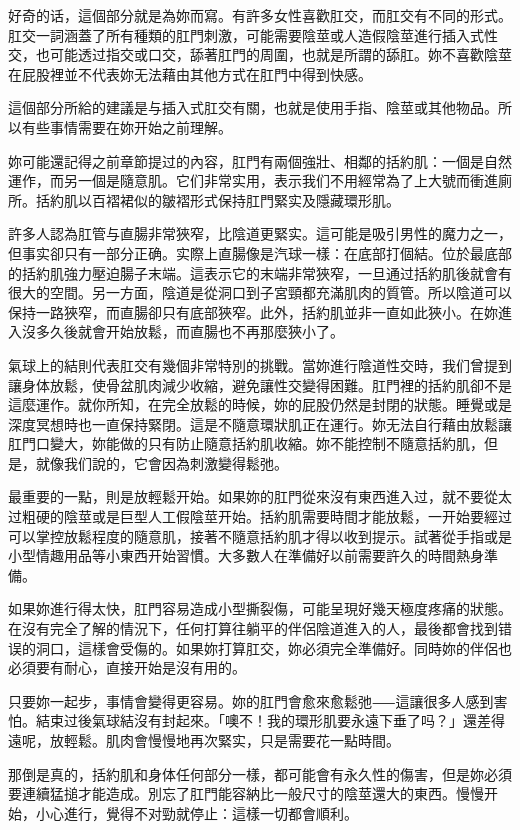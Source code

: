 \documentclass[12pt,UTF8]{ctexbook}
\begin{document}
好奇的话，這個部分就是為妳而寫。有許多女性喜歡肛交，而肛交有不同的形式。肛交一詞涵蓋了所有種類的肛門刺激，可能需要陰莖或人造假陰莖進行插入式性交，也可能透过指交或口交，舔著肛門的周圍，也就是所謂的舔肛。妳不喜歡陰莖在屁股裡並不代表妳无法藉由其他方式在肛門中得到快感。

這個部分所給的建議是与插入式肛交有關，也就是使用手指、陰莖或其他物品。所以有些事情需要在妳开始之前理解。

妳可能還記得之前章節提过的內容，肛門有兩個強壯、相鄰的括約肌：一個是自然運作，而另一個是隨意肌。它们非常实用，表示我们不用經常為了上大號而衝進廁所。括約肌以百褶裙似的皺褶形式保持肛門緊实及隱藏環形肌。

許多人認為肛管与直腸非常狹窄，比陰道更緊实。這可能是吸引男性的魔力之一，但事实卻只有一部分正确。实際上直腸像是汽球一樣：在底部打個結。位於最底部的括約肌強力壓迫腸子末端。這表示它的末端非常狹窄，一旦通过括約肌後就會有很大的空間。另一方面，陰道是從洞口到子宮頸都充滿肌肉的質管。所以陰道可以保持一路狹窄，而直腸卻只有底部狹窄。此外，括約肌並非一直如此狹小。在妳進入沒多久後就會开始放鬆，而直腸也不再那麼狹小了。

氣球上的結則代表肛交有幾個非常特別的挑戰。當妳進行陰道性交時，我们曾提到讓身体放鬆，使骨盆肌肉減少收縮，避免讓性交變得困難。肛門裡的括約肌卻不是這麼運作。就你所知，在完全放鬆的時候，妳的屁股仍然是封閉的狀態。睡覺或是深度冥想時也一直保持緊閉。這是不隨意環狀肌正在運行。妳无法自行藉由放鬆讓肛門口變大，妳能做的只有防止隨意括約肌收縮。妳不能控制不隨意括約肌，但是，就像我们說的，它會因為刺激變得鬆弛。

最重要的一點，則是放輕鬆开始。如果妳的肛門從來沒有東西進入过，就不要從太过粗硬的陰莖或是巨型人工假陰莖开始。括約肌需要時間才能放鬆，一开始要經过可以掌控放鬆程度的隨意肌，接著不隨意括約肌才得以收到提示。試著從手指或是小型情趣用品等小東西开始習慣。大多數人在準備好以前需要許久的時間熱身準備。

如果妳進行得太快，肛門容易造成小型撕裂傷，可能呈現好幾天極度疼痛的狀態。在沒有完全了解的情況下，任何打算往躺平的伴侶陰道進入的人，最後都會找到错误的洞口，這樣會受傷的。如果妳打算肛交，妳必須完全準備好。同時妳的伴侶也必須要有耐心，直接开始是沒有用的。

只要妳一起步，事情會變得更容易。妳的肛門會愈來愈鬆弛⸺這讓很多人感到害怕。結束过後氣球結沒有封起來。「噢不！我的環形肌要永遠下垂了吗？」還差得遠呢，放輕鬆。肌肉會慢慢地再次緊实，只是需要花一點時間。

那倒是真的，括約肌和身体任何部分一樣，都可能會有永久性的傷害，但是妳必須要連續猛搥才能造成。別忘了肛門能容納比一般尺寸的陰莖還大的東西。慢慢开始，小心進行，覺得不对勁就停止：這樣一切都會順利。
\end{document}
